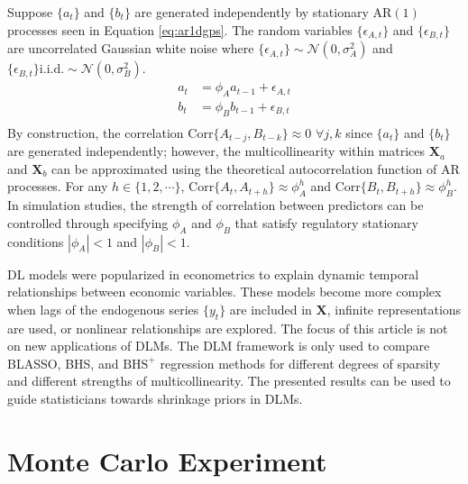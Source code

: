 Suppose $\{a_t\}$ and $\{b_t\}$ are generated independently by stationary AR$(1)$ processes seen in Equation \ref{eq:ar1dgps}. The random variables $\{\epsilon_{A,t}\}$ and $\{\epsilon_{B,t}\}$ are uncorrelated Gaussian white noise where $\{\epsilon_{A,t}\}\sim \mathcal{N}(0,\sigma^2_A)$ and $\{\epsilon_{B,t}\}\textrm{i.i.d.}\sim \mathcal{N}(0,\sigma^2_B)$.
\begin{equation}
\label{eq:ar1dgps}
\begin{split}
 a_t&=\phi_A a_{t-1}+\epsilon_{A,t} \\
 b_t&=\phi_B b_{t-1}+\epsilon_{B,t} \\
\end{split}
\end{equation}
By construction, the correlation Corr$\{A_{t-j},B_{t-k}\}\approx 0$ $\forall j,k$ since $\{a_t\}$ and $\{b_t\}$ are generated independently; however, the multicollinearity within matrices $\bm{X}_a$ and $\bm{X}_b$ can be approximated using the theoretical autocorrelation function of AR processes. For any $h\in \{1,2,\cdots\}$, Corr$\{A_{t},A_{t+h}\}\approx\phi_A^h$ and Corr$\{B_{t},B_{t+h}\}\approx\phi_B^h$. In simulation studies, the strength of correlation between predictors can be controlled through specifying $\phi_A$ and $\phi_B$ that satisfy regulatory stationary conditions $|\phi_A|<1$ and $|\phi_B|<1$.

DL models were popularized in econometrics to explain dynamic temporal relationships between economic variables. These models become more complex when lags of the endogenous series $\{y_t\}$ are included in $\bm{X}$, infinite representations are used, or nonlinear relationships are explored. The focus of this article is not on new applications of DLMs. The DLM framework is only used to compare BLASSO, BHS, and $\textrm{BHS}^+$ regression methods for different degrees of sparsity and different strengths of multicollinearity. The presented results can be used to guide statisticians towards shrinkage priors in DLMs.













\bigskip
\section{Monte Carlo Experiment}
\label{sec:mcdlm}

